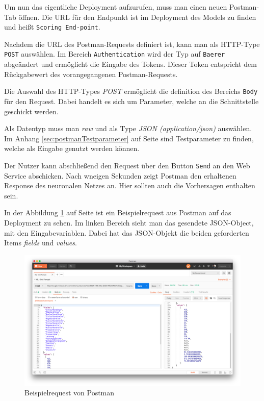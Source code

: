 Um nun das eigentliche Deployment aufzurufen, muss man einen neuen Postman-Tab öffnen. Die URL für den Endpunkt ist im
Deployment des Models zu finden und heißt \texttt{Scoring End-point}.

Nachdem die URL des Postman-Requests definiert ist, kann man als HTTP-Type \texttt{POST} auswählen. Im Bereich
\texttt{Authentication} wird der Typ auf \texttt{Baerer} abgeändert und ermöglicht die Eingabe des Tokens. Dieser Token
entspricht dem Rückgabewert des vorangegangenen Postman-Requests.

Die Auswahl des HTTP-Types \textit{POST} ermöglicht die definition des Bereichs \texttt{Body} für den Request. Dabei
handelt es sich um Parameter, welche an die Schnittstelle geschickt werden.

Als Datentyp muss man \textit{raw} und als Type \textit{JSON (application/json)} auswählen. Im Anhang
\ref{sec:postmanTestparameter} auf Seite \pageref{sec:postmanTestparameter} sind Testparameter zu finden, welche als
Eingabe genutzt werden können.

Der Nutzer kann abschließend den Request über den Button \texttt{Send} an den Web Service abschicken. Nach wneigen
Sekunden zeigt Postman den erhaltenen Response des neuronalen Netzes an. Hier sollten auch die Vorhersagen enthalten sein.

In der Abbildung \ref{fig:umsetzung_deployment_postman} auf Seite \pageref{fig:umsetzung_deployment_postman} ist ein
Beispielrequest aus Postman auf das Deployment zu sehen. Im linken Bereich sieht man das gesendete JSON-Object, mit den
Eingabevariablen. Dabei hat das JSON-Objekt die beiden geforderten Items \textit{fields} und \textit{values}.

\begin{figure}[h]
    \centering
    \includegraphics[width=\textwidth]{images/kapitel_3/deployment_postman.png}
    \caption{Beispielrequest von Postman}
    \label{fig:umsetzung_deployment_postman}
\end{figure}

